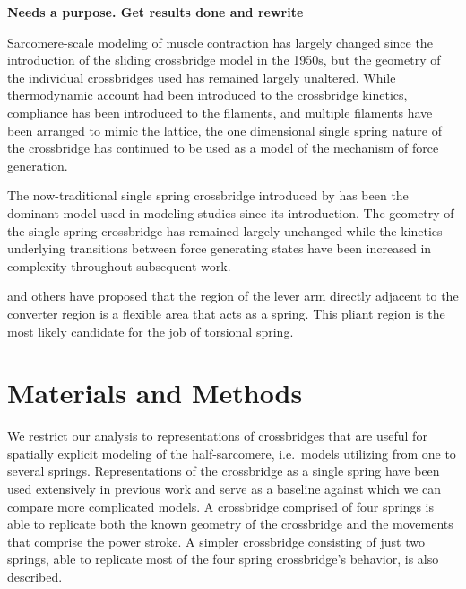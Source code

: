 \documentclass[]{article}
\begin{document}

\textbf{Needs a purpose. Get results done and rewrite}

Sarcomere-scale modeling of muscle contraction has largely changed since the introduction of the sliding crossbridge model in the 1950s, but the geometry of the individual crossbridges used has remained largely unaltered. 
While thermodynamic account had been introduced to the crossbridge kinetics, compliance has been introduced to the filaments, and multiple filaments have been arranged to mimic the lattice, the one dimensional single spring nature of the crossbridge has continued to be used as a model of the mechanism of force generation.

The now-traditional single spring crossbridge introduced by \citet{Huxley:1957:p255} has been the dominant model used in modeling studies since its introduction. 
The geometry of the single spring crossbridge has remained largely unchanged while the kinetics underlying transitions between force generating states have been increased in complexity throughout subsequent work. \citep{Pate:1989:p181, Daniel:1998:p1611, Chase:2004:p204, Tanner:2007:pe115}

\citet{Houdusse:2001:p182} and others have proposed that the region of the lever arm directly adjacent to the converter region is a flexible area that acts as a spring. This pliant region is the most likely candidate for the job of torsional spring. 




\section{Materials and Methods}  %


We restrict our analysis to representations of crossbridges that are useful for spatially explicit modeling of the half-sarcomere, i.e.\ models utilizing from one to several springs.
Representations of the crossbridge as a single spring have been used extensively in previous work and serve as a baseline against which we can compare more complicated models.
A crossbridge comprised of four springs is able to replicate both the known geometry of the crossbridge and the movements that comprise the power stroke.
A simpler crossbridge consisting of just two springs, able to replicate most of the four spring crossbridge's behavior, is also described.
\end{document}

